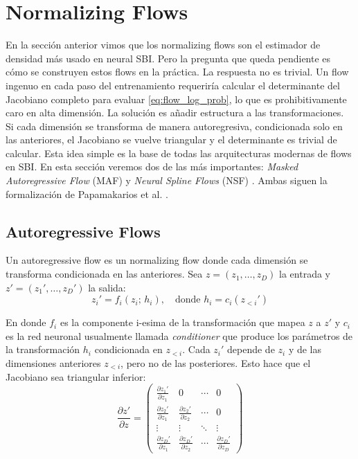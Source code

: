 \section{Normalizing Flows}

En la sección anterior vimos que los normalizing flows son el estimador de densidad más usado en neural SBI. Pero la pregunta que queda pendiente es cómo se construyen estos flows en la práctica. La respuesta no es trivial. Un flow ingenuo en cada paso del entrenamiento requeriría calcular el determinante del Jacobiano completo para evaluar \eqref{eq:flow_log_prob}, lo que es prohibitivamente caro en alta dimensión. La solución es añadir estructura a las transformaciones. Si cada dimensión se transforma de manera autoregresiva, condicionada solo en las anteriores, el Jacobiano se vuelve triangular y el determinante es trivial de calcular. Esta idea simple es la base de todas las arquitecturas modernas de flows en SBI. En esta sección veremos dos de las más importantes: \textit{Masked Autoregressive Flow} (MAF) \cite{papamakarios2018maf} y \textit{Neural Spline Flows} (NSF) \cite{durkan2019nsf}. Ambas siguen la formalización de Papamakarios et al. \cite{papamakarios2021}.

\subsection{Autoregressive Flows}

Un autoregressive flow es un normalizing flow donde cada dimensión se transforma condicionada en las anteriores. Sea $z = (z_1, \dots, z_D)$ la entrada y $z' = (z_1', \dots, z_D')$ la salida:
\begin{equation}
z_i' = f_i(z_i;\, h_i), \quad \text{donde } h_i = c_i(z_{<i}')
\end{equation}

En donde $f_i$ es la componente i-esima de la transformación que mapea $z$ a $z'$ y $c_i$ es la red neuronal usualmente llamada \textit{conditioner} que produce los parámetros de la transformación $h_i$ condicionada en $z_{<i}$. Cada $z_i'$ depende de $z_i$ y de las dimensiones anteriores $z_{<i}$, pero no de las posteriores. Esto hace que el Jacobiano sea triangular inferior:
\begin{equation}
\frac{\partial z'}{\partial z} =
\begin{pmatrix}
\frac{\partial z_1'}{\partial z_1} & 0 & \cdots & 0 \\
\frac{\partial z_2'}{\partial z_1} & \frac{\partial z_2'}{\partial z_2} & \cdots & 0 \\
\vdots & \vdots & \ddots & \vdots \\
\frac{\partial z_D'}{\partial z_1} & \frac{\partial z_D'}{\partial z_2} & \cdots & \frac{\partial z_D'}{\partial z_D}
\end{pmatrix}
\end{equation}

